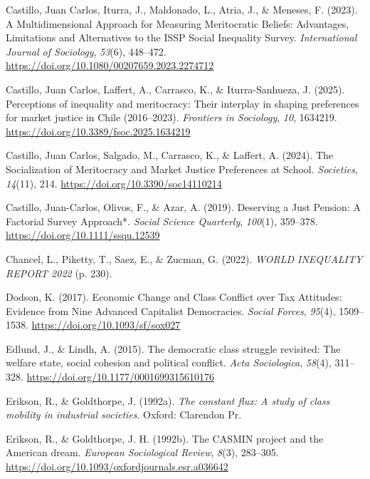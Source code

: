 \documentclass[
  12pt,
]{article}
\newlength{\cslhangindent}
\newenvironment{CSLReferences}[2] %
 {\begin{list}{}{%
  \setlength{\itemindent}{0pt}
  \setlength{\leftmargin}{0pt}
  \setlength{\parsep}{0pt}
  \ifodd #1
   \setlength{\leftmargin}{\cslhangindent}
   \setlength{\itemindent}{-1\cslhangindent}
  \fi
  \setlength{\itemsep}{#2\baselineskip}}}
 {\end{list}}
\begin{document}
\begin{CSLReferences}{1}{0}
Castillo, Juan Carlos, Iturra, J., Maldonado, L., Atria, J., \& Meneses,
F. (2023). A {Multidimensional Approach} for {Measuring Meritocratic
Beliefs}: {Advantages}, {Limitations} and {Alternatives} to the {ISSP
Social Inequality Survey}. \emph{International Journal of Sociology},
\emph{53}(6), 448--472.
\url{https://doi.org/10.1080/00207659.2023.2274712}

Castillo, Juan Carlos, Laffert, A., Carrasco, K., \& Iturra-Sanhueza, J.
(2025). Perceptions of inequality and meritocracy: Their interplay in
shaping preferences for market justice in {Chile} (2016--2023).
\emph{Frontiers in Sociology}, \emph{10}, 1634219.
\url{https://doi.org/10.3389/fsoc.2025.1634219}

Castillo, Juan Carlos, Salgado, M., Carrasco, K., \& Laffert, A. (2024).
The {Socialization} of {Meritocracy} and {Market Justice Preferences} at
{School}. \emph{Societies}, \emph{14}(11), 214.
\url{https://doi.org/10.3390/soc14110214}

Castillo, Juan-Carlos, Olivos, F., \& Azar, A. (2019). Deserving a {Just
Pension}: {A Factorial Survey Approach}*. \emph{Social Science
Quarterly}, \emph{100}(1), 359--378.
\url{https://doi.org/10.1111/ssqu.12539}

Chancel, L., Piketty, T., Saez, E., \& Zucman, G. (2022). \emph{{WORLD
INEQUALITY REPORT} 2022} (p. 230).

Dodson, K. (2017). Economic {Change} and {Class Conflict} over {Tax
Attitudes}: {Evidence} from {Nine Advanced Capitalist Democracies}.
\emph{Social Forces}, \emph{95}(4), 1509--1538.
\url{https://doi.org/10.1093/sf/sox027}

Edlund, J., \& Lindh, A. (2015). The democratic class struggle
revisited: {The} welfare state, social cohesion and political conflict.
\emph{Acta Sociologica}, \emph{58}(4), 311--328.
\url{https://doi.org/10.1177/0001699315610176}

Erikson, R., \& Goldthorpe, J. (1992a). \emph{The constant flux: A study
of class mobility in industrial societies}. Oxford: Clarendon Pr.

Erikson, R., \& Goldthorpe, J. H. (1992b). The {CASMIN} project and the
{American} dream. \emph{European Sociological Review}, \emph{8}(3),
283--305. \url{https://doi.org/10.1093/oxfordjournals.esr.a036642}


\end{CSLReferences}
\end{document}
